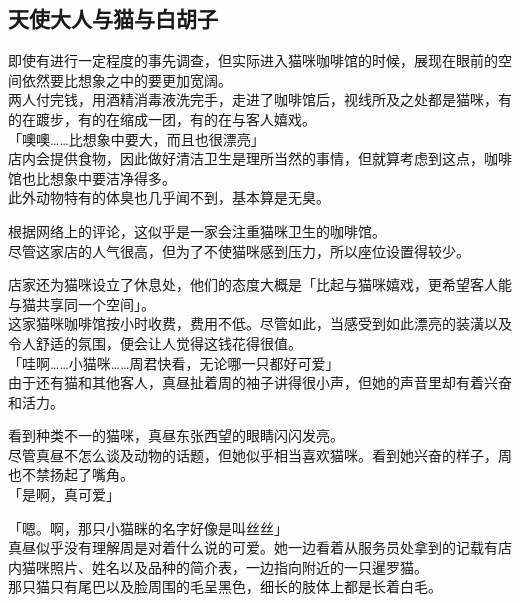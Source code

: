 \subsection{天使大人与猫与白胡子}

即使有进行一定程度的事先调查，但实际进入猫咪咖啡馆的时候，展现在眼前的空间依然要比想象之中的要更加宽阔。\\

两人付完钱，用酒精消毒液洗完手，走进了咖啡馆后，视线所及之处都是猫咪，有的在踱步，有的在缩成一团，有的在与客人嬉戏。\\

「噢噢……比想象中要大，而且也很漂亮」\\

店内会提供食物，因此做好清洁卫生是理所当然的事情，但就算考虑到这点，咖啡馆也比想象中要洁净得多。\\

此外动物特有的体臭也几乎闻不到，基本算是无臭。

根据网络上的评论，这似乎是一家会注重猫咪卫生的咖啡馆。\\

尽管这家店的人气很高，但为了不使猫咪感到压力，所以座位设置得较少。

店家还为猫咪设立了休息处，他们的态度大概是「比起与猫咪嬉戏，更希望客人能与猫共享同一个空间」。\\

这家猫咪咖啡馆按小时收费，费用不低。尽管如此，当感受到如此漂亮的装潢以及令人舒适的氛围，便会让人觉得这钱花得很值。\\

「哇啊……小猫咪……周君快看，无论哪一只都好可爱」\\

由于还有猫和其他客人，真昼扯着周的袖子讲得很小声，但她的声音里却有着兴奋和活力。

看到种类不一的猫咪，真昼东张西望的眼睛闪闪发亮。\\

尽管真昼不怎么谈及动物的话题，但她似乎相当喜欢猫咪。看到她兴奋的样子，周也不禁扬起了嘴角。\\

「是啊，真可爱」

「嗯。啊，那只小猫眯的名字好像是叫丝丝」\\

真昼似乎没有理解周是对着什么说的可爱。她一边看着从服务员处拿到的记载有店内猫咪照片、姓名以及品种的简介表，一边指向附近的一只暹罗猫。\\

那只猫只有尾巴以及脸周围的毛呈黑色，细长的肢体上都是长着白毛。

